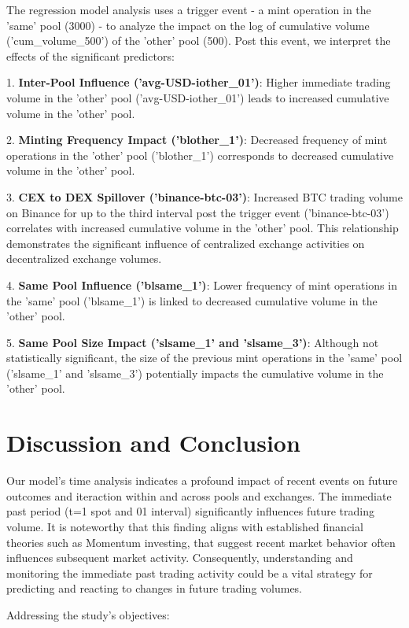 \documentclass{article}
\begin{document}
The regression model analysis uses a trigger event - a mint operation in the 'same' pool (3000) - to analyze the impact on the log of cumulative volume ('cum\_volume\_500') of the 'other' pool (500). Post this event, we interpret the effects of the significant predictors:

1. \textbf{Inter-Pool Influence ('avg-USD-iother\_01')}: Higher immediate trading volume in the 'other' pool ('avg-USD-iother\_01') leads to increased cumulative volume in the 'other' pool. 

2. \textbf{Minting Frequency Impact ('blother\_1')}: Decreased frequency of mint operations in the 'other' pool ('blother\_1') corresponds to decreased cumulative volume in the 'other' pool.

3. \textbf{CEX to DEX Spillover ('binance-btc-03')}: Increased BTC trading volume on Binance for up to the third interval post the trigger event ('binance-btc-03') correlates with increased cumulative volume in the 'other' pool. This relationship demonstrates the significant influence of centralized exchange activities on decentralized exchange volumes.

4. \textbf{Same Pool Influence ('blsame\_1')}: Lower frequency of mint operations in the 'same' pool ('blsame\_1') is linked to decreased cumulative volume in the 'other' pool.

5. \textbf{Same Pool Size Impact ('slsame\_1' and 'slsame\_3')}: Although not statistically significant, the size of the previous mint operations in the 'same' pool ('slsame\_1' and 'slsame\_3') potentially impacts the cumulative volume in the 'other' pool.

\section{\textbf{Discussion and Conclusion}}

Our model's time analysis indicates a profound impact of recent events on future outcomes and iteraction within and across pools and exchanges. The immediate past period (t=1 spot and 01 interval) significantly influences future trading volume. It is noteworthy that this finding aligns with established financial theories such as Momentum investing, that suggest recent market behavior often influences subsequent market activity. Consequently, understanding and monitoring the immediate past trading activity could be a vital strategy for predicting and reacting to changes in future trading volumes.

Addressing the study's objectives:
\end{document}

